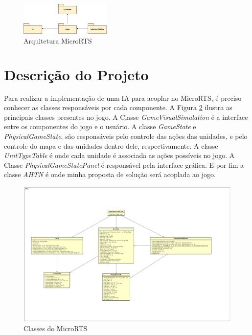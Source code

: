  \begin{figure}[ht]
 	\centering
 	\includegraphics[width=0.4\textwidth]{fig/pacotes.pdf}
 	\caption{Arquitetura MicroRTS}
 	\label{fig:pacotes}
 \end{figure} 
 
\section{Descrição do Projeto}
 
Para realizar a implementação de uma IA para acoplar no MicroRTS, é preciso conhecer as classes responsáveis por cada componente. A Figura \ref{fig:classes} ilustra as principais classes presentes no jogo. A Classe \textit{GameVisualSimulation} é a interface entre os componentes do jogo e o usuário. A classe \textit{GameState} e \textit{PhysicalGameState}, são responsáveis pelo controle das ações das unidades, e pelo controle do mapa e das unidades dentro dele, respectivamente. A classe \textit{UnitTypeTable} é onde cada unidade é associada as ações possíveis no jogo. A Classe \textit{PhysicalGameStatePanel} é responsável pela interface gráfica. E por fim a classe \textit{AHTN} é onde minha proposta de solução será acoplada ao jogo.
 
  \begin{figure}[ht]
  	\centering
  	\includegraphics[width=1\textwidth]{fig/classes.pdf}
  	\caption{Classes do MicroRTS}
  	\label{fig:classes}
  \end{figure} 

